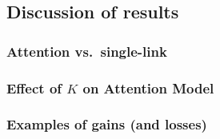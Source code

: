 \subsection{Discussion of results}

\subsubsection{Attention vs.\ single-link}

\subsubsection{Effect of $K$ on Attention Model}


\subsubsection{Examples of gains (and losses)}


